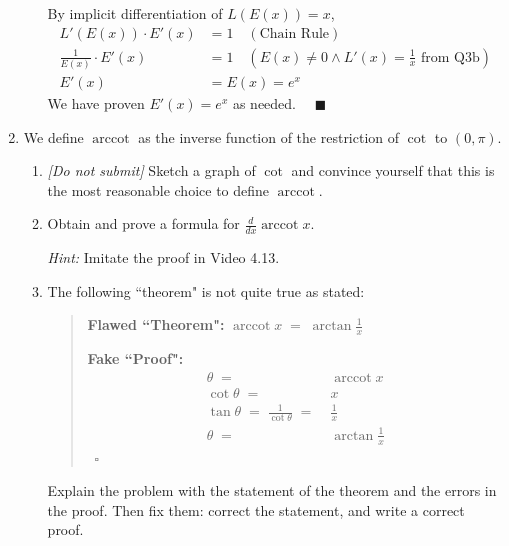 \documentclass[12pt]{exam}
\newcommand {\DS} [1] {${\displaystyle #1}$}
\newcommand{\vv}{\vspace{.1cm}}
\DeclareMathOperator{\arccot}{arccot}
\begin{document}
\begin{enumerate}
\begin{enumerate}
	    By implicit differentiation of $L(E(x))=x$, 
	    \begin{align*}
	        L'(E(x))\cdot E'(x)&=1\quad(\mbox{Chain Rule})\\
	        \frac{1}{E(x)}\cdot E'(x)&=1\quad(E(x)\neq0 \land L'(x)=\frac{1}{x}\mbox{ from Q3b})\\
	        E'(x)&=E(x)=e^x
	    \end{align*}
	    We have proven $E'(x)=e^x$ as needed. $\quad\blacksquare$
	\end{enumerate}

\vv

\item  We define $\arccot$ as the inverse function of the restriction of $\cot$ to \DS{(0, \pi)}.
	\begin{enumerate}
		\item \emph{[Do not submit]}  Sketch a graph of $\cot$ and convince yourself that this is the most reasonable choice to define $\arccot$.
		\item   Obtain and prove a formula for \DS{\frac{d}{dx} \arccot x}.
		
			\emph{Hint:}  Imitate the proof in Video 4.13.

		\item The following ``theorem" is not quite true as stated:
		
			\begin{quotation}
			{\bf Flawed ``Theorem":}   \DS{ \arccot x \; = \; \arctan \frac{1}{x} }
			
			{\bf Fake ``Proof":}   \vspace{-.5cm}
				\begin{align*}
					\theta \; =& \; \arccot x \\
					 \cot \theta \; =& \;  x \\
					 \tan \theta \; = \; \frac{1}{\cot \theta} \; =& \; \frac{1}{x} \\
					 \theta  \; =& \;  \arctan \frac{1}{x}  
				\end{align*}
				\ \hfill $\square$
			\end{quotation}

	Explain the problem with the statement of the theorem and the errors in the proof.  Then fix them: correct the statement, and write a correct proof.
	\end{enumerate}


\end{enumerate}
\end{document}
